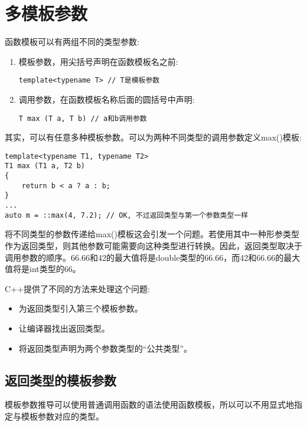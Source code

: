\section{多模板参数}

函数模板可以有两组不同的类型参数:

\begin{enumerate}
\item 
模板参数，用尖括号声明在函数模板名之前:
\begin{lstlisting}[style=styleCXX]
template<typename T> // T是模板参数
\end{lstlisting}

\item 
调用参数，在函数模板名称后面的圆括号中声明:
\begin{lstlisting}[style=styleCXX]
T max (T a, T b) // a和b调用参数
\end{lstlisting}
\end{enumerate}

其实，可以有任意多种模板参数。可以为两种不同类型的调用参数定义max()模板:

\begin{lstlisting}[style=styleCXX]
template<typename T1, typename T2>
T1 max (T1 a, T2 b)
{
	return b < a ? a : b;
}
...
auto m = ::max(4, 7.2); // OK, 不过返回类型与第一个参数类型一样
\end{lstlisting}

将不同类型的参数传递给max()模板这会引发一个问题。若使用其中一种形参类型作为返回类型，则其他参数可能需要向这种类型进行转换。因此，返回类型取决于调用参数的顺序。66.66和42的最大值将是double类型的66.66，而42和66.66的最大值将是int类型的66。

C++提供了不同的方法来处理这个问题:

\begin{itemize}
\item
为返回类型引入第三个模板参数。

\item
让编译器找出返回类型。

\item
将返回类型声明为两个参数类型的“公共类型”。
\end{itemize}

\subsection{返回类型的模板参数}

模板参数推导可以使用普通调用函数的语法使用函数模板，所以可以不用显式地指定与模板参数对应的类型。

